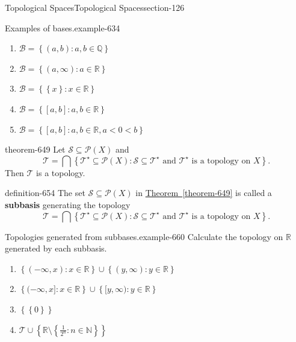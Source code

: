 \documentclass[oneside,10pt,]{article}
\newcommand{\terminology}[1]{\textbf{#1}}
\newcommand{\mb}{\mathbb}
\newcommand{\mc}{\mathcal}
\newcommand{\setBuilder}[2]{\left\{#1:#2\right\}}
\newcommand{\setList}[1]{\left\{#1\right\}}
\newcommand{\lt}{<}
\begin{document}
\begin{sectionptx}{Topological Spaces}{}{Topological Spaces}{}{}{section-126}
\begin{example}{Examples of bases.}{example-634}
\begin{enumerate}
\item\hypertarget{li-639}{}\(\mc B=\setBuilder{(a,b)}{a,b\in\mb Q}\)%
\item\hypertarget{li-641}{}\(\mc B=\setBuilder{(a,\infty)}{a\in\mb R}\)%
\item\hypertarget{li-643}{}\(\mc B=\setBuilder{\setList{x}}{x\in\mb R}\)%
\item\hypertarget{li-645}{}\(\mc B=\setBuilder{[a,b]}{a,b\in\mb R}\)%
\item\hypertarget{li-647}{}\(\mc B=\setBuilder{[a,b]}{a,b\in\mb R,a\lt0\lt b}\)%
\end{enumerate}
\end{example}
\begin{theorem}{}{}{theorem-649}%
\hypertarget{p-650}{}%
Let \(\mc S\subseteq\mc P(X)\) and%
\begin{equation*}
\mc T=\bigcap\setBuilder{\mc T^\star\subseteq\mc P(X)}{\mc S\subseteq\mc T^\star \text{ and }
\mc T^\star \text{ is a topology on } X}.
\end{equation*}
Then \(\mc T\) is a topology.%
\end{theorem}
\begin{definition}{}{definition-654}%
\hypertarget{p-655}{}%
The set \(\mc S\subseteq\mc P(X)\) in \hyperref[theorem-649]{Theorem~\ref{theorem-649}} is called a \terminology{subbasis} generating the topology%
\begin{equation*}
\mc T=\bigcap\setBuilder{\mc T^\star\subseteq\mc P(X)}{\mc S\subseteq\mc T^\star \text{ and }
\mc T^\star \text{ is a topology on } X}.
\end{equation*}
%
\end{definition}
\begin{example}{Topologies generated from subbases.}{example-660}%
\hypertarget{p-662}{}%
Calculate the topology on \(\mb R\) generated by each subbasis.%
\leavevmode%
\begin{enumerate}
\item\hypertarget{li-665}{}\(\setBuilder{(-\infty,x)}{x\in\mb R}\cup\setBuilder{(y,\infty)}{y\in\mb R}\)%
\item\hypertarget{li-667}{}\(\setBuilder{(-\infty,x]}{x\in\mb R}\cup\setBuilder{[y,\infty)}{y\in\mb R}\)%
\item\hypertarget{li-669}{}\(\setList{\setList{0}}\)%
\item\hypertarget{li-671}{}\(\mc T\cup\setList{\mb R\setminus\setBuilder{\frac{1}{2^n}}{n\in\mb N}}\)%
\end{enumerate}
\end{example}

\end{sectionptx}
\end{document}
